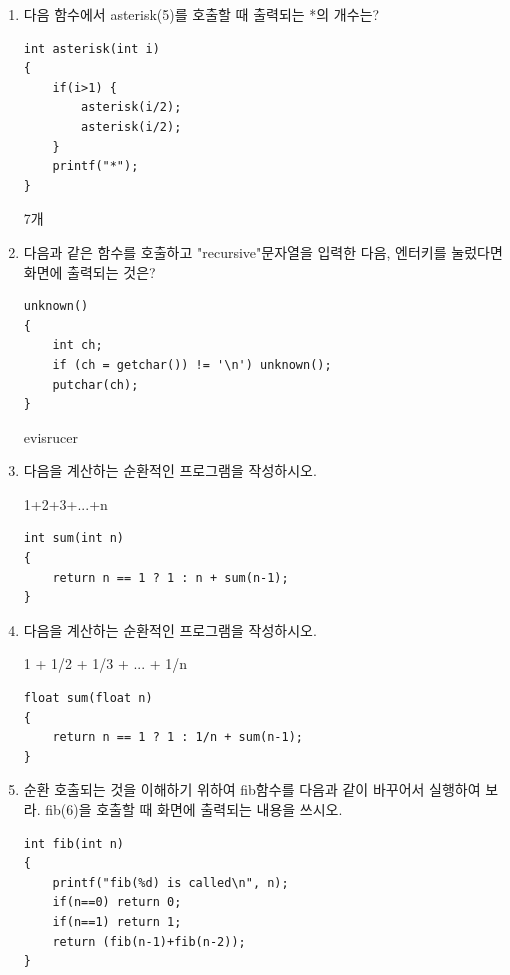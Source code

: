 \documentclass[11pt,a4paper]{article}
\begin{document}
\begin{enumerate}
\item 다음 함수에서 asterisk(5)를 호출할 때 출력되는 *의 개수는?
\begin{lstlisting}
int asterisk(int i)
{
	if(i>1) {
		asterisk(i/2);
		asterisk(i/2);
	}
	printf("*");
}
\end{lstlisting}
7개

\item 다음과 같은 함수를 호출하고 "recursive"문자열을 입력한 다음, 엔터키를 눌렀다면 화면에 출력되는 것은?
\begin{lstlisting}
unknown()
{
	int ch;
	if (ch = getchar()) != '\n') unknown();
	putchar(ch);
}
\end{lstlisting}
evisrucer

\item 다음을 계산하는 순환적인 프로그램을 작성하시오.

	1+2+3+...+n
\begin{lstlisting}
int sum(int n)
{
	return n == 1 ? 1 : n + sum(n-1);
}
\end{lstlisting}
\item 다음을 계산하는 순환적인 프로그램을 작성하시오.

1 + 1/2 + 1/3 + ... + 1/n
\begin{lstlisting}
float sum(float n)
{
	return n == 1 ? 1 : 1/n + sum(n-1);
}
\end{lstlisting}

\item 순환 호출되는 것을 이해하기 위하여 fib함수를 다음과 같이 바꾸어서 실행하여 보라. fib(6)을 호출할 때 화면에 출력되는 내용을 쓰시오.
\begin{lstlisting}
int fib(int n)
{
	printf("fib(%d) is called\n", n);
	if(n==0) return 0;
	if(n==1) return 1;
	return (fib(n-1)+fib(n-2));
}
\end{lstlisting}


\end{enumerate}
\end{document}
